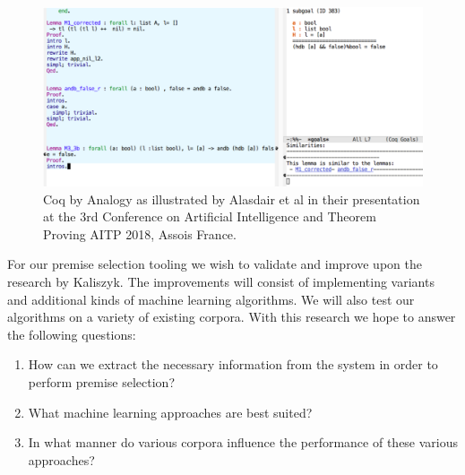 \begin{figure}[H]
  \centerline{\includegraphics[width=1.0\textwidth]{assets/coqanalogy.png}}
  \caption{Coq by Analogy as illustrated by Alasdair et al in their presentation
    at the 3rd Conference on Artificial Intelligence and Theorem Proving AITP 2018, Assois France.}
  \label{figure:coq-analogy}
\end{figure}

For our premise selection tooling we wish to validate and improve upon the research by Kaliszyk.
The improvements will consist of implementing variants and additional kinds of machine learning algorithms.
We will also test our algorithms on a variety of existing \coq corpora.
With this research we hope to answer the following questions:
\begin{enumerate}
\item How can we extract the necessary information from the \coq system in order to perform premise selection?
\item What machine learning approaches are best suited?
\item In what manner do various corpora influence the performance of these various approaches?
\end{enumerate}

